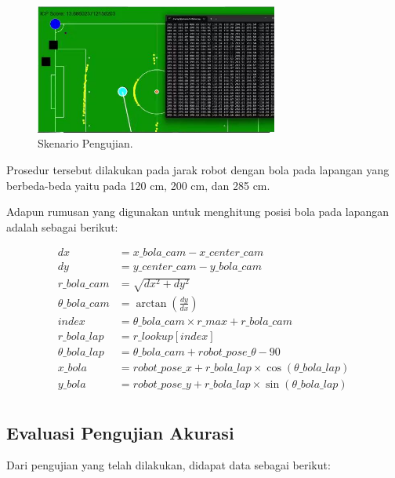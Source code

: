 \begin{figure}[ht]
  \centering
  \includegraphics[width=8cm]{gambar/saat_putar_bola_2.jpeg}
  \caption{Skenario Pengujian.}
  \label{fig:skenariopengujian}
\end{figure}

Prosedur tersebut dilakukan pada jarak robot dengan bola pada lapangan yang berbeda-beda yaitu pada 120 cm, 200 cm, dan 285 cm. 

Adapun rumusan yang digunakan untuk menghitung posisi bola pada lapangan adalah sebagai berikut: 

\begin{equation}
  \begin{aligned}
    dx &= x\_bola\_cam - x\_center\_cam \\
    dy &= y\_center\_cam - y\_bola\_cam \\
    r\_bola\_cam &= \sqrt{dx^2 + dy^2} \\
    \theta\_bola\_cam &= \arctan(\frac{dy}{dx}) \\
    index &= \theta\_bola\_cam \times r\_max + r\_bola\_cam \\ 
    r\_bola\_lap &= r\_lookup[index] \\
    \theta\_bola\_lap &= \theta\_bola\_cam + robot\_pose\_\theta - 90 \\
    x\_bola &= robot\_pose\_x + r\_bola\_lap \times \cos(\theta\_bola\_lap) \\
    y\_bola &= robot\_pose\_y + r\_bola\_lap \times \sin(\theta\_bola\_lap) \\
  \end{aligned}
\end{equation}

\subsection{Evaluasi Pengujian Akurasi}
\label{sec:analisispengujian}

Dari pengujian yang telah dilakukan, didapat data sebagai berikut:

